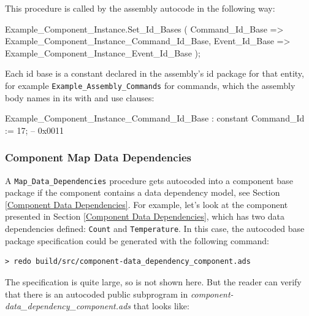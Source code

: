 This procedure is called by the assembly autocode in the following way:

\vspace{5mm} %
\begin{adacode}
  Example_Component_Instance.Set_Id_Bases (
    Command_Id_Base => Example_Component_Instance_Command_Id_Base,
    Event_Id_Base => Example_Component_Instance_Event_Id_Base
  );
\end{adacode}
\vspace{5mm} %

Each id base is a constant declared in the assembly's id package for that entity, for example \texttt{Example\_Assembly\_Commands} for commands, which the assembly body names in its with and use clauses:

\vspace{5mm} %
\begin{adacode}
  Example_Component_Instance_Command_Id_Base : constant Command_Id := 17; -- 0x0011
\end{adacode}
\vspace{5mm} %

\subsubsection{Component Map Data Dependencies} \label{Component Set Data Dependency IDs}

A \texttt{Map\_Data\_Dependencies} procedure gets autocoded into a component base package if the component contains a data dependency model, see Section \ref{Component Data Dependencies}. For example, let's look at the component presented in Section \ref{Component Data Dependencies}, which has two data dependencies defined: \texttt{Count} and \texttt{Temperature}. In this case, the autocoded base package specification could be generated with the following command:

\vspace{5mm} %
\begin{verbatim}
> redo build/src/component-data_dependency_component.ads
\end{verbatim}
\vspace{5mm} %

The specification is quite large, so is not shown here. But the reader can verify that there is an autocoded public subprogram in \textit{component-data\_dependency\_component.ads} that looks like:

